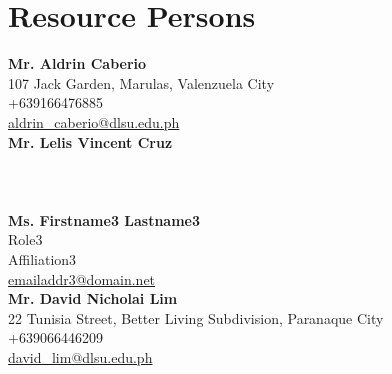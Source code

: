 %
%
%                 

\chapter{Resource Persons}
\label{sec:appendixc}

%
%
%
%

%
%
\newcommand{\resperson}[4]{\textbf{#1} \\ #2 \\ #3 \\ \url{#4}\vspace{0.5em}\\}

\resperson{Mr. Aldrin Caberio}{107 Jack Garden, Marulas, Valenzuela City}{+639166476885}{aldrin_caberio@dlsu.edu.ph}
\resperson{Mr. Lelis Vincent Cruz}{}{}{}
\resperson{Ms. Firstname3 Lastname3}{Role3}{Affiliation3}{emailaddr3@domain.net}
\resperson{Mr. David Nicholai Lim}{22 Tunisia Street, Better Living Subdivision, Paranaque City}{+639066446209}{david_lim@dlsu.edu.ph}
